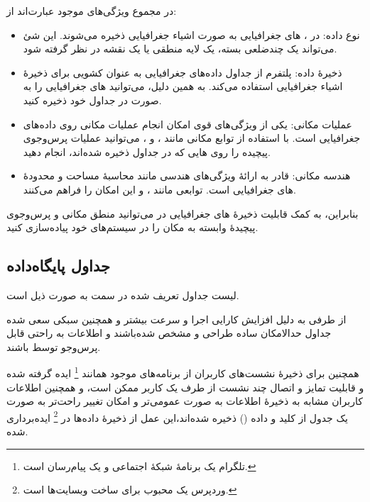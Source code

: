 در مجموع ویژگی‌های موجود عبارت‌اند از:

\begin{itemize}[nosep]
	\item
	نوع داده: در ، های جغرافیایی به صورت اشیاء جغرافیایی ذخیره
	می‌شوند. این شئ می‌تواند یک چندضلعی بسته، یک لایه منطقی یا یک نقشه در
	نظر گرفته شود.
	\item
	ذخیرهٔ داده: پلتفرم  از جداول داده‌های جغرافیایی به عنوان کشویی برای
	ذخیرهٔ اشیاء جغرافیایی استفاده می‌کند. به همین دلیل، می‌توانید
	های جغرافیایی را به صورت  در جداول خود ذخیره کنید.
	\item
	عملیات مکانی: یکی از ویژگی‌های قوی  امکان انجام عملیات مکانی روی
	داده‌های جغرافیایی است. با استفاده از توابع مکانی مانند ،
	 و ، می‌توانید عملیات پرس‌وجوی پیچیده را روی
	هایی که در جداول ذخیره شده‌اند، انجام دهید.
	\item
	هندسه مکانی:
	 قادر به ارائهٔ ویژگی‌های هندسی مانند محاسبهٔ مساحت و
	محدودهٔ های جغرافیایی است. توابعی مانند ،  و
	 این امکان را فراهم می‌کنند.
\end{itemize}

بنابراین، به کمک قابلیت ذخیرهٔ های جغرافیایی در  می‌توانید
منطق مکانی و پرس‌وجوی پیچیدهٔ وابسته به مکان را در سیستم‌های خود پیاده‌سازی
کنید.


\subsection{جداول پایگاه‌داده}\label{sub1:sec1:chap3}

لیست جداول تعریف شده در سمت  به صورت ذیل است.

از طرفی به دلیل افزایش کارایی اجرا و سرعت بیشتر و همچنین سبکی سعی شده
جداول حدالامکان ساده طراحی و مشخص شده‌باشند و اطلاعات به راحتی قابل
پرس‌وجو توسط  باشند.

همچنین برای ذخیرهٔ نشست‌های کاربران از برنامه‌های موجود همانند
\footnote{
	تلگرام یک برنامهٔ شبکهٔ اجتماعی و یک پیام‌رسان است.
}
ایده گرفته شده و قابلیت تمایز و اتصال چند نشست از طرف یک کاربر ممکن است،
و همچنین اطلاعات کاربران مشابه به ذخیرهٔ اطلاعات به صورت عمومی‌تر و امکان
تغییر راحت‌تر به صورت یک جدول از کلید و داده
() ذخیره شده‌اند،‌این
عمل از ذخیرهٔ‌ داده‌ها در
\footnote{
	وردپرس یک
	محبوب برای ساخت وبسایت‌ها است.
}
ایده‌برداری شده.

